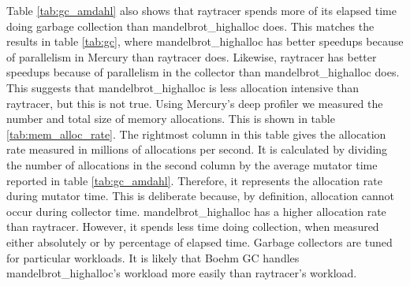 Table \ref{tab:gc_amdahl} also shows that raytracer spends more of its
elapsed time doing garbage collection than mandelbrot\_highalloc does.
This matches the results in table \ref{tab:gc},
where mandelbrot\_highalloc has better speedups because of parallelism in
Mercury than raytracer does.
Likewise,
raytracer has better speedups because of parallelism in the collector
than mandelbrot\_highalloc does.
This suggests that mandelbrot\_highalloc is less allocation intensive than
raytracer,
but this is not true.
Using Mercury's deep profiler we measured the number and total size of memory
allocations.
This is shown in table \ref{tab:mem_alloc_rate}.
The rightmost column in this table gives the allocation rate
measured in millions of allocations per second.
It is calculated by dividing the number of allocations in the second column
by the average mutator time reported in table \ref{tab:gc_amdahl}.
Therefore, it represents the allocation rate during mutator time.
This is deliberate because,
by definition,
allocation cannot occur during collector time.
mandelbrot\_highalloc has a higher allocation rate than raytracer.
However,
it spends less time doing collection, when measured either absolutely
or by percentage of elapsed time.
Garbage collectors are tuned for particular workloads.
It is likely that Boehm GC handles mandelbrot\_highalloc's workload more
easily than raytracer's workload.





